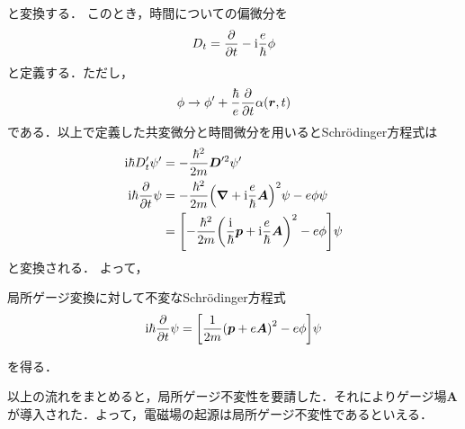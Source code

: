 \documentclass{report}
\begin{document}
  と変換する．
  このとき，時間についての偏微分を
  \begin{align}
    D_t = \pdv{t} - \mathrm{i}\frac{e}{\hbar}\phi
  \end{align}
  と定義する．ただし，
  \begin{align}
    \phi \to \phi' + \frac{\hbar}{e}\pdv{t}\alpha(\bm{r}, t)
  \end{align}
  である．以上で定義した共変微分と時間微分を用いるとSchrödinger方程式は
  \begin{align}
    \mathrm{i}\hbar D'_t\psi' &= -\frac{\hbar^2}{2m}\bm{D}'^2\psi' \\
    \mathrm{i}\hbar\pdv{t}\psi &= -\frac{\hbar^2}{2m}\qty(\grad + \mathrm{i}\frac{e}{\hbar}\bm{A})^2\psi - e\phi\psi\\
    &= \qty[-\frac{\hbar^2}{2m}\qty(\frac{\mathrm{i}}{\hbar}\bm{p} + \mathrm{i}\frac{e}{\hbar}\bm{A})^2 - e\phi]\psi
  \end{align}
  と変換される．
  よって，
  \begin{itembox}[l]{局所ゲージ変換に対して不変なSchrödinger方程式}
    \begin{align}
      \mathrm{i}\hbar\pdv{t}\psi=\qty[\frac{1}{2m}\qty(\bm{p} + e\bm{A})^2 - e\phi]\psi
    \end{align}
  \end{itembox}
  を得る．
  \par
  以上の流れをまとめると，局所ゲージ不変性を要請した．それによりゲージ場$\bm{A}$が導入された．よって，電磁場の起源は局所ゲージ不変性であるといえる．
\end{document}
